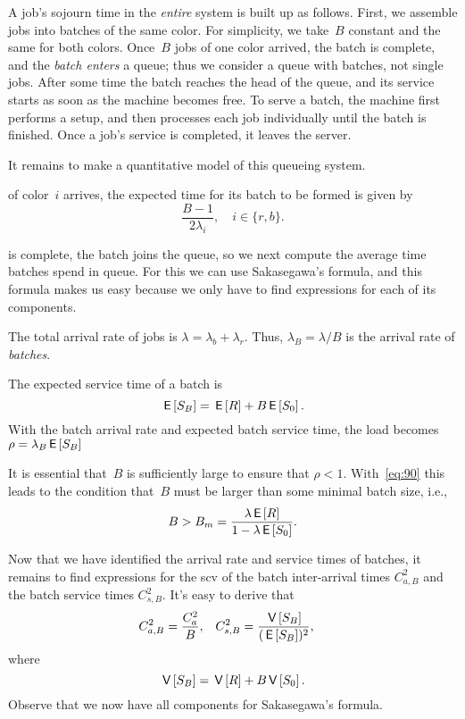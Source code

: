 \documentclass[stochastic-or.tex]{subfiles}
\begin{document}
A job's sojourn time in the \emph{entire} system is built up as follows.
First, we assemble jobs into batches of the same color.
For simplicity, we take~$B$ constant and the same for both colors.
Once~$B$ jobs of one color arrived, the batch is complete, and the \emph{batch enters} a queue; thus we consider a queue with batches, not single jobs.
After some time the batch reaches the head of the queue, and its service starts as soon as the machine becomes free.
To serve a batch, the machine first performs a setup, and then processes each job individually until the batch is finished.
Once a job's service is completed, it leaves the server.

It remains to make a quantitative model of this queueing system.


 of color~$i$ arrives, the expected time for its batch to be formed is given by
\begin{equation}\label{eq:79}
\frac{B-1}{2\lambda_i}, \quad i\in \{r, b\}.
\end{equation}

 is complete, the batch joins the queue, so we next compute the average time batches spend in queue.
For this we can use Sakasegawa's formula, and this formula makes us easy because we only have to find expressions for each of its components.

The total arrival rate of jobs is $\lambda= \lambda_b+\lambda_r$. Thus, $\lambda_B=\lambda/B$ is the arrival rate of \emph{batches}.

The expected service time of a batch is
\begin{equation}\label{eq:90}
\,\mathsf{E}\left[S_B\right] = \,\mathsf{E}\left[R\right] + B\,\mathsf{E}\left[S_0\right].
\end{equation}
With the batch arrival rate and expected batch service time, the load becomes  $\rho = \lambda_B \,\mathsf{E}\left[S_B\right]$

It is essential that~$B$ is sufficiently large to ensure that $\rho<1$.
With~\cref{eq:90} this leads to the condition that~$B$ must be larger than some minimal batch size, i.e.,
\begin{equation*}
B> B_m = \frac{\lambda \,\mathsf{E}\left[R\right]}{1-\lambda \,\mathsf{E}\left[S_0\right]}.
\end{equation*}

Now that we have identified the arrival rate and service times of batches, it remains to find expressions for the scv of the batch inter-arrival times $C_{a,B}^2$ and the batch service times $C_{s,B}^2$. It's easy to derive that
 \begin{align}\label{eq:82}
C_{a,B}^2 &= \frac{C_{a}^2}B, &
C_{s, B}^2 &= \frac{\,\mathsf{V}\left[S_B\right]}{(\,\mathsf{E}\left[S_B\right])^2},
\end{align}
where
\begin{equation*}
  \,\mathsf{V}\left[S_B\right] = \,\mathsf{V}\left[R\right]  + B \,\mathsf{V}\left[S_0\right].
\end{equation*}
Observe that we now have all components for Sakasegawa's formula.
\end{document}
